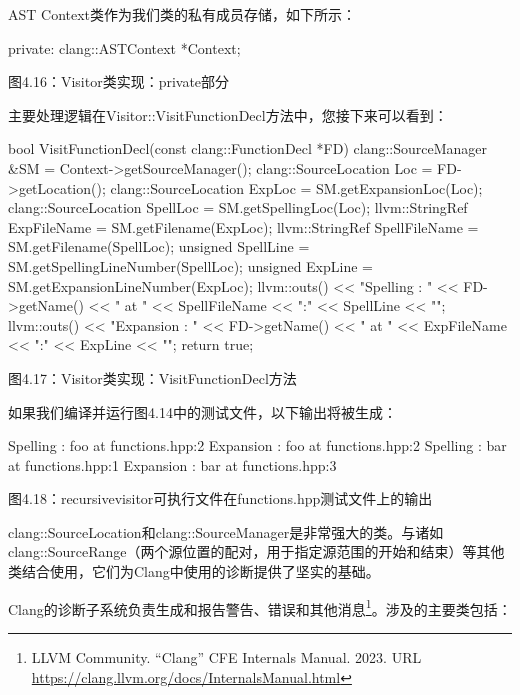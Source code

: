 AST Context类作为我们类的私有成员存储，如下所示：

\begin{cpp}
private:
  clang::ASTContext *Context;
\end{cpp}

\begin{center}
图4.16：Visitor类实现：private部分
\end{center}

主要处理逻辑在Visitor::VisitFunctionDecl方法中，您接下来可以看到：

\begin{cpp}
bool VisitFunctionDecl(const clang::FunctionDecl *FD) {
  clang::SourceManager &SM = Context->getSourceManager();
  clang::SourceLocation Loc = FD->getLocation();
  clang::SourceLocation ExpLoc = SM.getExpansionLoc(Loc);
  clang::SourceLocation SpellLoc = SM.getSpellingLoc(Loc);
  llvm::StringRef ExpFileName = SM.getFilename(ExpLoc);
  llvm::StringRef SpellFileName = SM.getFilename(SpellLoc);
  unsigned SpellLine = SM.getSpellingLineNumber(SpellLoc);
  unsigned ExpLine = SM.getExpansionLineNumber(ExpLoc);
  llvm::outs() << "Spelling : " << FD->getName() << " at " << SpellFileName
               << ":" << SpellLine << "\n";
  llvm::outs() << "Expansion : " << FD->getName() << " at " << ExpFileName
               << ":" << ExpLine << "\n";
  return true;
}
\end{cpp}

\begin{center}
图4.17：Visitor类实现：VisitFunctionDecl方法
\end{center}

如果我们编译并运行图4.14中的测试文件，以下输出将被生成：

\begin{shell}
Spelling : foo at functions.hpp:2
Expansion : foo at functions.hpp:2
Spelling : bar at functions.hpp:1
Expansion : bar at functions.hpp:3
\end{shell}

\begin{center}
图4.18：recursivevisitor可执行文件在functions.hpp测试文件上的输出
\end{center}

clang::SourceLocation和clang::SourceManager是非常强大的类。与诸如clang::SourceRange（两个源位置的配对，用于指定源范围的开始和结束）等其他类结合使用，它们为Clang中使用的诊断提供了坚实的基础。


Clang的诊断子系统负责生成和报告警告、错误和其他消息\footnote{LLVM Community. “Clang” CFE Internals Manual. 2023. URL \url{https://clang.llvm.org/docs/InternalsManual.html}}。涉及的主要类包括：

